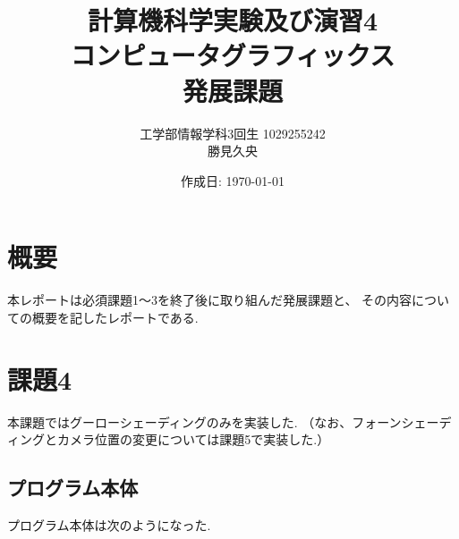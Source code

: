 \documentclass[a4j,dvipdfmx]{jsarticle}
\begin{document}
\title{計算機科学実験及び演習4\\コンピュータグラフィックス\\発展課題}
\author{工学部情報学科3回生 1029255242\\勝見久央}
\date{作成日: \today} %
\maketitle
\section{概要}
本レポートは必須課題1〜3を終了後に取り組んだ発展課題と、
その内容についての概要を記したレポートである.

\section{課題4}
本課題ではグーローシェーディングのみを実装した.
（なお、フォーンシェーディングとカメラ位置の変更については課題5で実装した.）
\subsection{プログラム本体}
プログラム本体は次のようになった.

\end{document}
